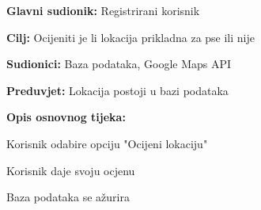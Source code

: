 					\noindent {}
					\begin{packed_item}
	
						\item \textbf{Glavni sudionik: }Registrirani korisnik
						\item  \textbf{Cilj:} Ocijeniti je li lokacija prikladna za pse ili nije
						\item  \textbf{Sudionici:} Baza podataka, Google Maps API
						\item  \textbf{Preduvjet:} Lokacija postoji u bazi podataka
						\item  \textbf{Opis osnovnog tijeka:}
						
						\item[] \begin{packed_enum}
	
							\item Korisnik odabire opciju "Ocijeni lokaciju"
							\item Korisnik daje svoju ocjenu
							\item Baza podataka se ažurira

						\end{packed_enum}
						
					\end{packed_item}
					
